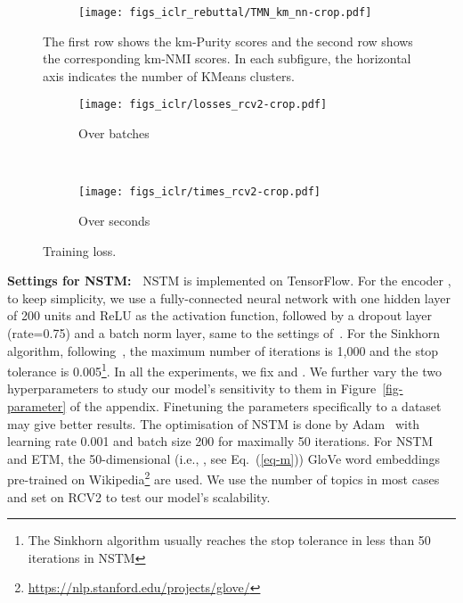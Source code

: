 \documentclass{article}
\begin{document}
\begin{figure}
\begin{minipage}{0.68\textwidth}
\begin{subfigure}[b]{0.32\linewidth}
                 \centering
                 \texttt{[image: figs\_iclr\_rebuttal/TMN\_km\_nn-crop.pdf]}
         \end{subfigure}\vspace{0.3cm}
\caption{The first row shows the km-Purity scores and the second row shows the corresponding km-NMI scores. In each subfigure, the horizontal axis indicates the number of KMeans clusters.}
\label{fig-km}
\end{minipage}
\hspace{0.0005\textwidth}
\begin{minipage}{0.3\textwidth}
        \begin{subfigure}[b]{0.9\linewidth}
                 \centering
                 \caption{Over batches}
                 \texttt{[image: figs\_iclr/losses\_rcv2-crop.pdf]}
         \end{subfigure}
       \vspace{0.1cm}
        \\
         \begin{subfigure}[b]{0.9\linewidth}
                 \centering
               \caption{Over seconds}
                 \texttt{[image: figs\_iclr/times\_rcv2-crop.pdf]}
         \end{subfigure} 
\caption{Training loss.}
\label{fig-time}
\end{minipage}
\end{figure}

\textbf{Settings for NSTM:~}
NSTM is implemented on TensorFlow. For the encoder , to keep simplicity, we use a fully-connected neural network with one hidden layer of 200 units and ReLU as the activation function, followed by a dropout layer (rate=0.75) and a batch norm layer, same to the settings of~\cite{burkhardt2019decoupling}. For the Sinkhorn algorithm, following~\cite{cuturi2013sinkhorn}, the maximum number of  iterations is 1,000 and the stop tolerance is 0.005\footnote{The Sinkhorn algorithm usually reaches the stop tolerance in less than 50 iterations in NSTM}. In all the experiments, we fix  and . 
We further vary the two hyperparameters to study our model's sensitivity to them in Figure~\ref{fig-parameter} of the appendix. Finetuning the parameters specifically to a dataset may give better results. The optimisation of NSTM is done by Adam~\citep{kingma2014adam} with learning rate 0.001 and batch size 200 for maximally 50 iterations. For NSTM and ETM, the 50-dimensional (i.e., , see Eq.~(\ref{eq-m})) GloVe word embeddings~\citep{pennington2014glove} pre-trained on Wikipedia\footnote{\url{https://nlp.stanford.edu/projects/glove/}} are used.
We use the number of topics  in most cases and set  on RCV2 to test our model's scalability. 
\end{document}
